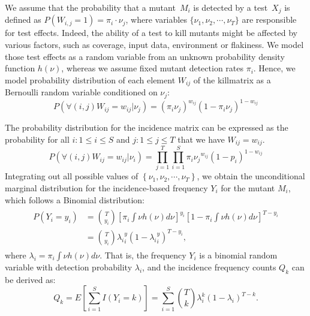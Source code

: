 \documentclass[sigconf,review,anonymous]{acmart}
\begin{document}
We assume that the probability that a mutant~$M_i$ is detected by a test~$X_j$ is defined as
$P(W_{i,j}=1) = \pi_{i} \cdot \nu_{j}$,
where variables $\{\nu_{1}, \nu_{2},\cdots,\nu_{T}\}$ are responsible for test effects.
Indeed, the ability of a test to kill mutants might be affected by various factors, such as coverage, input data, environment or flakiness.
We model those test effects as a random
variable from an unknown probability density function $h(\nu)$, whereas
we assume fixed mutant detection rates $\pi_i$.
%
Hence, we model probability distribution of each element $W_{ij}$ of the killmatrix as a Bernoulli random variable conditioned on $\nu_j$:
\small
\begin{displaymath}
    P(\forall (i,j) W_{ij}=w_{ij}|\nu_j)=(\pi_i \nu_j)^{w_{ij}}(1-\pi_i \nu_j)^{1-w_{ij}}
\end{displaymath}
\normalsize

The probability distribution for the incidence matrix can be expressed as the
probability for all $i:1\leq i \leq S $ and $j:1\leq j\leq T$ that we have $W_{ij} = w_{ij}$.
\[
    P\left(\forall (i,j) W_{ij}=w_{ij}|\nu_{i} \right)= \prod_{j=1}^{T}\prod_{i=1}^{S} {\pi_i \nu_j}^{w_{ij}} (1-p_i)^{1-w_{ij}}
\]
Integrating out all possible values of $\left\{\nu_1, \nu_2,\cdots,\nu_T \right\}$, we obtain the unconditional marginal distribution for the incidence-based frequency $Y_i$ for the mutant $M_i$,
which follows a Binomial distribution:
\begin{gather*}
    \begin{split}
        P(Y_i=y_i)&={T \choose y_i}\left[\pi_i\int \nu h(\nu) d\nu\right]^{y_i} \left[1-\pi_i\int \nu h(\nu) d\nu \right]^{T-y_i} \\
        &={T \choose y_i}{\lambda_i}^y_i (1-{\lambda_i}^y_i)^{T-y_i},
    \end{split}
\end{gather*}
where  $\lambda_i=\pi_i \int \nu h(\nu)d\nu$.
That is, the frequency $Y_i$ is a binomial random variable with detection probability $\lambda_i$,
and the incidence frequency counts $Q_k$ can be derived as:
\[
    Q_k=E\left[ \sum_{i=1}^{S}I(Y_i=k)  \right]=\sum_{i=1}^{S}{T \choose k}\lambda_{i}^k(1-\lambda_{i})^{T-k}.
\]
\end{document}
